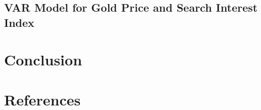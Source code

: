 \documentclass[a4paper]{article}
\theoremstyle{definition}
\begin{document}
\subsection{VAR Model for Gold Price and Search Interest Index}
%
\newpage
\section{Conclusion}
%
%
%
%
%
%
%
%
\newpage
{}
\section*{References}
\printbibliography
\end{document}
